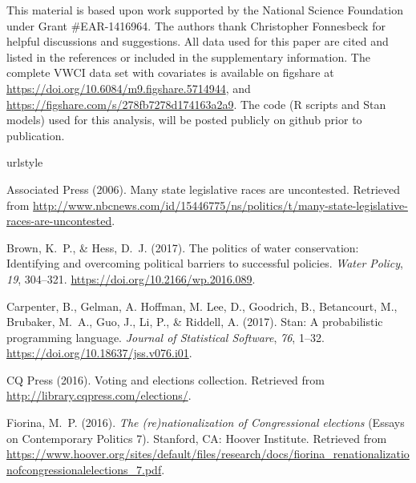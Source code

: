 \documentclass[draft,linenumbers]{agujournal}
\begin{document}
\acknowledgments
This material is based upon work supported by the National Science Foundation
under Grant \#EAR-1416964.
The authors thank Christopher Fonnesbeck for helpful discussions and suggestions.
All data used for this paper are cited and listed in the references or
included in the supplementary information.
The complete VWCI data set with
covariates is available on figshare at \url{https://doi.org/10.6084/m9.figshare.5714944},
and \url{https://figshare.com/s/278fb7278d174163a2a9}.
The code (R scripts and Stan models) used for this analysis, will be
posted publicly on github prior to publication.
%
%
\begin{thebibliography}{33}
\providecommand{\natexlab}[1]{#1}
\expandafter\ifx\csname urlstyle\endcsname\relax
  \providecommand{\doi}[1]{doi:\discretionary{}{}{}#1}\else
  \providecommand{\doi}{doi:\discretionary{}{}{}\begingroup
  \urlstyle{rm}\Url}\fi

  Associated Press (2006).
  Many state legislative races are uncontested.
  Retrieved from
  \url{http://www.nbcnews.com/id/15446775/ns/politics/t/many-state-legislative-races-are-uncontested}.

  Brown, K.~P., \& Hess, D.~J. (2017).
  The politics of water conservation:
  Identifying and overcoming political barriers to successful policies.
  \textit{Water Policy}, \textit{19}, 304--321.
  \url{https://doi.org/10.2166/wp.2016.089}.

  Carpenter, B., Gelman, A. Hoffman, M. Lee, D., Goodrich, B., Betancourt, M.,
  Brubaker, M.~A., Guo, J., Li, P., \& Riddell, A. (2017).
  Stan: A probabilistic programming language.
  \textit{Journal of Statistical Software}, \textit{76}, 1--32.
  \url{https://doi.org/10.18637/jss.v076.i01}.

{CQ Press} (2016).
  Voting and elections collection.
  Retrieved from
  \url{http://library.cqpress.com/elections/}.

  Fiorina, M.~P. (2016).
  \textit{The (re)nationalization of {C}ongressional elections\/}
  (Essays on Contemporary Politics 7).
  Stanford, CA: Hoover Institute.
  Retrieved from
  \url{https://www.hoover.org/sites/default/files/research/docs/fiorina_renationalizationofcongressionalelections_7.pdf}.


\end{thebibliography}
\end{document}
